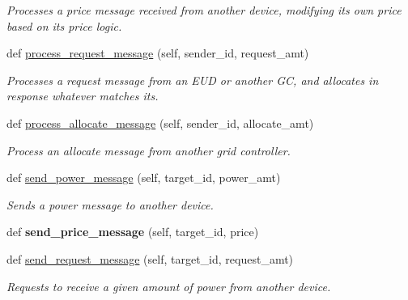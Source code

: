 \begin{DoxyCompactItemize}
\begin{DoxyCompactList}\small\item\em Processes a price message received from another device, modifying its own price based on its price logic. \end{DoxyCompactList}\item 
def \hyperlink{class_build_1_1_objects_1_1grid__controller_1_1_grid_controller_a70878c4f7a8a7cb46cc1b0097e0d91fd}{process\+\_\+request\+\_\+message} (self, sender\+\_\+id, request\+\_\+amt)
\begin{DoxyCompactList}\small\item\em Processes a request message from an E\+UD or another GC, and allocates in response whatever matches its. \end{DoxyCompactList}\item 
def \hyperlink{class_build_1_1_objects_1_1grid__controller_1_1_grid_controller_ad917e30e3b828571c02657d8052cf075}{process\+\_\+allocate\+\_\+message} (self, sender\+\_\+id, allocate\+\_\+amt)
\begin{DoxyCompactList}\small\item\em Process an allocate message from another grid controller. \end{DoxyCompactList}\item 
def \hyperlink{class_build_1_1_objects_1_1grid__controller_1_1_grid_controller_a2d1690b10f41cdef2d74895c2a971b58}{send\+\_\+power\+\_\+message} (self, target\+\_\+id, power\+\_\+amt)
\begin{DoxyCompactList}\small\item\em Sends a power message to another device. \end{DoxyCompactList}\item 
\mbox{\label{class_build_1_1_objects_1_1grid__controller_1_1_grid_controller_ac6aa57134d55af7248149fdf9a661ffd}} 
def {\bfseries send\+\_\+price\+\_\+message} (self, target\+\_\+id, price)
\item 
def \hyperlink{class_build_1_1_objects_1_1grid__controller_1_1_grid_controller_a0eb0f617f66e5dc0c1f2f4d853251c3c}{send\+\_\+request\+\_\+message} (self, target\+\_\+id, request\+\_\+amt)
\begin{DoxyCompactList}\small\item\em Requests to receive a given amount of power from another device. \end{DoxyCompactList}\item 

\end{DoxyCompactItemize}
